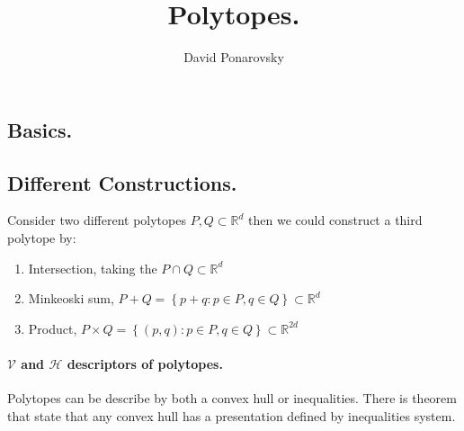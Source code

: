 \documentclass{article}
\newcommand{\expp}[1]{ \mathbf{E} \left[ {#1} \right]}
\begin{document}
\newcommand{\dalg}[1]{\expp{#1 : \text{alg} \sim \tilde{\text{alg}}}}
\newcommand{\dsig}[1]{\expp{#1 : \sigma \sim \tilde{\sigma}}}
\newcommand{\calg}{c_{\text{alg}}}
\newcommand{\cbase}{c_{\text{base}}}



\title{Polytopes.} 
\author{David Ponarovsky}
\maketitle



\begin{multicols*}{2}

  \section{Basics.} 
  

  \subsection{Different Constructions.} 
  Consider two different polytopes $P,Q \subset \mathbb{R}^{d}$ then we could construct a third polytope by: 
  \begin{enumerate}
    \item Intersection, taking the $P\cap Q \subset \mathbb{R}^{d}$
    \item Minkeoski sum, $P+Q = \left\{ p + q : p \in P, q \in Q \right\} \subset \mathbb{R}^{d}$
    \item Product, $P \times  Q = \left\{ \left( p,q \right):  p \in P, q \in Q \right\} \subset \mathbb{R}^{2d}$
  \end{enumerate}

  \paragraph{ $\mathcal{V}$ and $\mathcal{H}$ descriptors of polytopes.} Polytopes can be describe by both a convex hull or inequalities. There is theorem that state that any convex hull has a presentation defined by inequalities system.
\end{multicols*}
  
\end{document}
